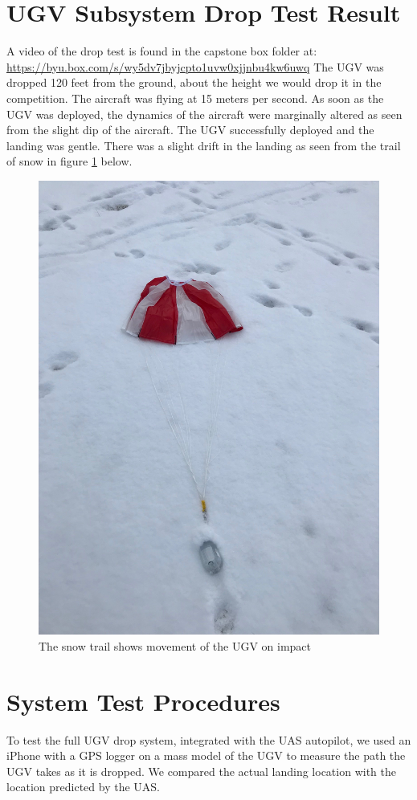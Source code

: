 \documentclass[]{auvsi_doc}
\begin{document}
\section*{UGV Subsystem Drop Test Result}
A video of the drop test is found in the capstone box folder at: \url{https://byu.box.com/s/wy5dv7jbyjcpto1uvw0xjjnbu4kw6uwq}
The UGV was dropped 120 feet from the ground, about the height we would drop it in the competition. The aircraft was flying at 15 meters per second.
As soon as the UGV was deployed, the dynamics of the aircraft were marginally altered as seen from the slight dip of the aircraft.
The UGV successfully deployed and the landing was gentle. There was a slight drift in the landing as seen from the trail of snow in figure \ref{fig:landing} below.
\begin{figure}[h!]
	\centering
	\includegraphics[width=.9\columnwidth]{figs/landing}
	\caption{The snow trail shows movement of the UGV on impact}
	\label{fig:landing}
\end{figure} 


\section*{System Test Procedures}
To test the full UGV drop system, integrated with the UAS autopilot, we used an iPhone with a GPS logger on a mass model of the UGV to measure the path the UGV takes as it is dropped. 
We compared the actual landing location with the location predicted by the UAS.
\end{document}
